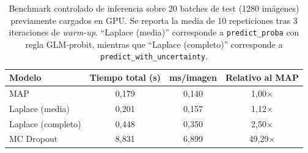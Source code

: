 \documentclass{article}
\begin{document}
\begin{table}[t]
\centering
\caption{Benchmark controlado de inferencia sobre 20 batches de test
(1280 im\'agenes) previamente cargados en GPU. Se reporta la media de 10
repeticiones tras 3 iteraciones de \emph{warm-up}. ``Laplace (media)''
corresponde a \texttt{predict\_proba} con regla GLM-probit, mientras que
``Laplace (completo)'' corresponde a
\texttt{predict\_with\_uncertainty}.}
\label{tab:timing_benchmark}
\begin{tabular}{lccc}
\toprule
Modelo & Tiempo total (s) & ms/imagen & Relativo al MAP \\
\midrule
MAP & 0,179 & 0,140 & 1,00$\times$ \\
Laplace (media) & 0,201 & 0,157 & 1,12$\times$ \\
Laplace (completo) & 0,448 & 0,350 & 2,50$\times$ \\
MC Dropout & 8,831 & 6,899 & 49,29$\times$ \\
\bottomrule
\end{tabular}
\end{table}

\end{document}
